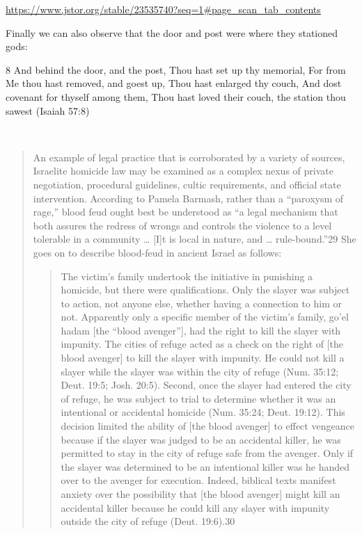 \documentclass[11pt]{article}
\begin{document}
{\url{https://www.jstor.org/stable/23535740?seq=1#page_scan_tab_contents}







Finally we can also observe that the door and post were where they stationed gods:

8 And behind the door, and the post, Thou hast set up thy memorial, For from Me thou hast removed, and goest up, Thou hast enlarged thy couch, And dost covenant for thyself among them, Thou hast loved their couch, the station thou sawest (Isaiah 57:8)


\
\begin{quote}
An example of legal practice that is corroborated by a variety of sources, Israelite homicide law may be examined as a complex nexus of private negotiation, procedural guidelines, cultic requirements, and official state intervention. According to Pamela Barmash, rather than a “paroxysm of rage,” blood feud ought best be understood as “a legal mechanism that both assures the redress of wrongs and controls the violence to a level tolerable in a community … [I]t is local in nature, and … rule-bound.”29 She goes on to describe blood-feud in ancient Israel as follows:
\begin{quote}

The victim’s family undertook the initiative in punishing a homicide, but there were qualifications. Only the slayer was subject to action, not anyone else, whether having a connection to him or not. Apparently only a specific member of the victim’s family, go’el hadam [the “blood avenger”], had the right to kill the slayer with impunity. The cities of refuge acted as a check on the right of [the blood avenger] to kill the slayer with impunity. He could not kill a slayer while the slayer was within the city of refuge (Num. 35:12; Deut. 19:5; Josh. 20:5). Second, once the slayer had entered the city of refuge, he was subject to trial to determine whether it was an intentional or accidental homicide (Num. 35:24; Deut. 19:12). This decision limited the ability of [the blood avenger] to effect vengeance because if the slayer was judged to be an accidental killer, he was permitted to stay in the city of refuge safe from the avenger. Only if the slayer was determined to be an intentional killer was he handed over to the avenger for execution. Indeed, biblical texts manifest anxiety over the possibility that [the blood avenger] might kill an accidental killer because he could kill any slayer with impunity outside the city of refuge (Deut. 19:6).30 
\end{quote}


\end{quote}}
\end{document}
